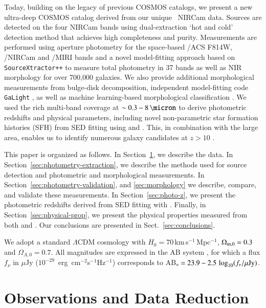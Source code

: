 \documentclass[longauth]{aa}
\begin{document}
Today, building on the legacy of previous COSMOS catalogs, we present a new ultra-deep  COSMOS catalog derived from our unique \JWST\ NIRCam data. 
Sources are detected on the four NIRCam bands using dual-extraction `hot and cold' detection method \citep{2004ApJS..152..163R,leauthaud_weak_2007} that achieves high completeness and purity. 
Measurements are performed using aperture photometry for the space-based \hst/ACS F814W, \JWST/NIRCam and \JWST/MIRI bands and a novel model-fitting approach based on \texttt{SourceXtractor++} \citep{bertin20, kummel20, Kummel2022} to measure total photometry in 37 bands as well as NIR morphology for over 700,000 galaxies. We also provide additional morphological measurements from bulge-disk decomposition, independent model-fitting code \texttt{GaLight} \citep{Ding2020, Birrer2021}, as well as machine learning-based morphological classification \citep{MHC2024}. We used the rich multi-band coverage at $\sim 0.3 - 8 \, \si{\micron}$ to derive photometric redshifts and physical parameters, including novel non-parametric star formation histories (SFH) from SED fitting using \lephare{} \citep{arnouts_measuring_2002, ilbert_accurate_2006} and \cigale{} \citep{Boquien19}. This, in combination with the large area, enables us to identify numerous galaxy candidates at $z>10$ \citep[e.g.,][]{Casey2024, Franco2024}. 


This paper is organized as follows. In Section~\ref{sec:data}, we describe the data. In Section~\ref{sec:photometry-extraction}, we describe the methods used for source detection and photometric and morphological measurements. In Section~\ref{sec:photometry-validation}, and \ref{sec:morphology} we describe, compare, and validate these measurements. In Section~\ref{sec:photo-z}, we present the photometric redshifts derived from SED fitting with \lephare{}. Finally, in Section~\ref{sec:physical-prop}, we present the physical properties measured from both \lephare{} and \cigale{}. Our conclusions are presented in Sect.~\ref{sec:conclusions}. 

We adopt a standard $\Lambda$CDM cosmology with $H_0=70$\,km\,s$^{-1}$\,Mpc$^{-1}$, $\Omega_{\rm m,0}=0.3$ and $\Omega_{\Lambda,0}=0.7$. All magnitudes are expressed in the AB system \citep{oke_absolute_1974}, for which a flux $f_\nu$ in $\mu$Jy
($10^{-29}$~erg~cm$^{-2}$s$^{-1}$Hz$^{-1}$) corresponds to AB$_\nu=23.9-2.5\,\log_{10}(f_\nu/{\rm \mu Jy})$.

\section{Observations and Data Reduction} \label{sec:data}
\end{document}

